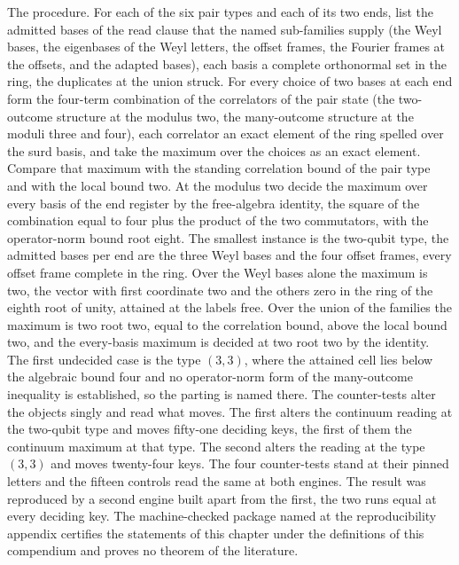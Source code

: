 \begin{chproof}
The procedure. For each of the six pair types and each of its two ends, list the admitted bases of the read clause that the named sub-families supply (the Weyl bases, the eigenbases of the Weyl letters, the offset frames, the Fourier frames at the offsets, and the adapted bases), each basis a complete orthonormal set in the ring, the duplicates at the union struck. For every choice of two bases at each end form the four-term combination of the correlators of the pair state (the two-outcome structure at the modulus two, the many-outcome structure at the moduli three and four), each correlator an exact element of the ring spelled over the surd basis, and take the maximum over the choices as an exact element. Compare that maximum with the standing correlation bound of the pair type and with the local bound two. At the modulus two decide the maximum over every basis of the end register by the free-algebra identity, the square of the combination equal to four plus the product of the two commutators, with the operator-norm bound root eight. The smallest instance is the two-qubit type, the admitted bases per end are the three Weyl bases and the four offset frames, every offset frame complete in the ring. Over the Weyl bases alone the maximum is two, the vector with first coordinate two and the others zero in the ring of the eighth root of unity, attained at the labels free. Over the union of the families the maximum is two root two, equal to the correlation bound, above the local bound two, and the every-basis maximum is decided at two root two by the identity.
The first undecided case is the type $(3,3)$, where the attained cell lies below the algebraic bound four and no operator-norm form of the many-outcome inequality is established, so the parting is named there.
The counter-tests alter the objects singly and read what moves. The first alters the continuum reading at the two-qubit type and moves fifty-one deciding keys, the first of them the continuum maximum at that type. The second alters the reading at the type $(3,3)$ and moves twenty-four keys. The four counter-tests stand at their pinned letters and the fifteen controls read the same at both engines. The result was reproduced by a second engine built apart from the first, the two runs equal at every deciding key.
The machine-checked package named at the reproducibility appendix certifies the statements of this chapter under the definitions of this compendium and proves no theorem of the literature.
\end{chproof}
